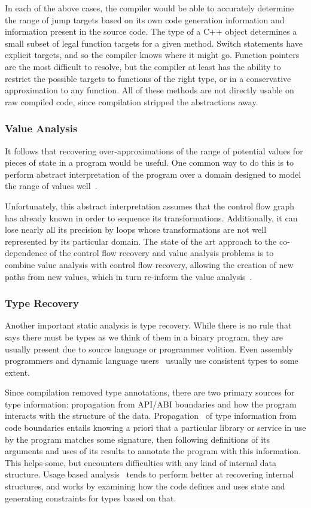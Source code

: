 In each of the above cases, the compiler would be able to accurately determine the range of jump targets based on its own code generation information and information present in the source code.
The type of a C++ object determines a small subset of legal function targets for a given method.
Switch statements have explicit targets, and so the compiler knows where it might go.
Function pointers are the most difficult to resolve, but the compiler at least has the ability to restrict the possible targets to functions of the right type, or in a conservative approximation to any function.
All of these methods are not directly usable on raw compiled code, since compilation stripped the abstractions away.

\subsubsection{Value Analysis}
\label{sec:valanal}
It follows that recovering over-approximations of the range of potential values for pieces of state in a program would be useful.
One common way to do this is to perform abstract interpretation of the program over a domain designed to model the range of values well~\cite{vsa,wrappedintervals,wrappedintervals2}.

Unfortunately, this abstract interpretation assumes that the control flow graph has already known in order to sequence its transformations.
Additionally, it can lose nearly all its precision by loops whose transformations are not well represented by its particular domain.
The state of the art approach to the co-dependence of the control flow recovery and value analysis problems is to combine value analysis with control flow recovery, allowing the creation of new paths from new values, which in turn re-inform the value analysis~\cite{jakstab}.

\subsubsection{Type Recovery}
Another important static analysis is type recovery.
While there is no rule that says there must be types as we think of them in a binary program, they are usually present due to source language or programmer volition.
Even assembly programmers and dynamic language users~\cite{jsinfer} usually use consistent types to some extent.

Since compilation removed type annotations, there are two primary sources for type information: propagation from API/ABI boundaries and how the program interacts with the structure of the data.
Propagation~\cite{howard} of type information from code boundaries entails knowing a priori that a particular library or service in use by the program matches some signature, then following definitions of its arguments and uses of its results to annotate the program with this information.
This helps some, but encounters difficulties with any kind of internal data structure.
Usage based analysis~\cite{tie,bitr} tends to perform better at recovering internal structures, and works by examining how the code defines and uses state and generating constraints for types based on that.

